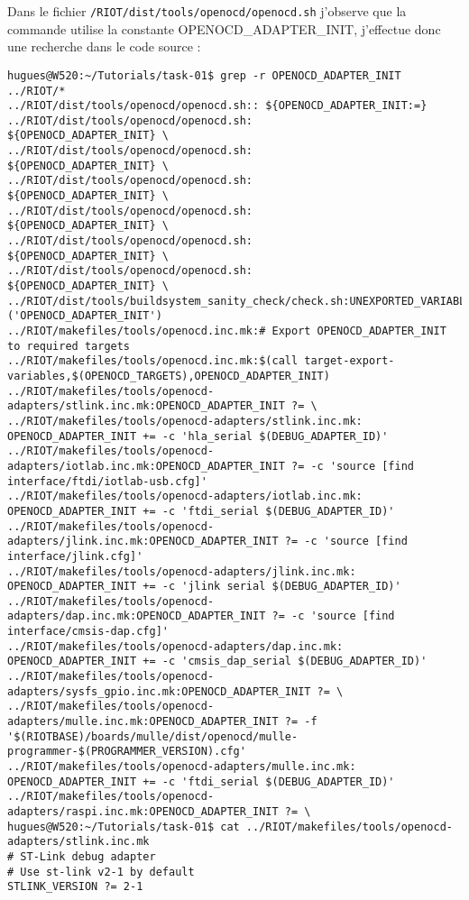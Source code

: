 Dans le fichier \texttt{/RIOT/dist/tools/openocd/openocd.sh} j'observe que la
commande utilise la constante OPENOCD\_ADAPTER\_INIT, j'effectue donc une recherche
dans le code source :
{\scriptsize
\begin{verbatim}
hugues@W520:~/Tutorials/task-01$ grep -r OPENOCD_ADAPTER_INIT ../RIOT/*
../RIOT/dist/tools/openocd/openocd.sh:: ${OPENOCD_ADAPTER_INIT:=}
../RIOT/dist/tools/openocd/openocd.sh:            ${OPENOCD_ADAPTER_INIT} \
../RIOT/dist/tools/openocd/openocd.sh:            ${OPENOCD_ADAPTER_INIT} \
../RIOT/dist/tools/openocd/openocd.sh:            ${OPENOCD_ADAPTER_INIT} \
../RIOT/dist/tools/openocd/openocd.sh:            ${OPENOCD_ADAPTER_INIT} \
../RIOT/dist/tools/openocd/openocd.sh:            ${OPENOCD_ADAPTER_INIT} \
../RIOT/dist/tools/openocd/openocd.sh:            ${OPENOCD_ADAPTER_INIT} \
../RIOT/dist/tools/buildsystem_sanity_check/check.sh:UNEXPORTED_VARIABLES+=('OPENOCD_ADAPTER_INIT')
../RIOT/makefiles/tools/openocd.inc.mk:# Export OPENOCD_ADAPTER_INIT to required targets
../RIOT/makefiles/tools/openocd.inc.mk:$(call target-export-variables,$(OPENOCD_TARGETS),OPENOCD_ADAPTER_INIT)
../RIOT/makefiles/tools/openocd-adapters/stlink.inc.mk:OPENOCD_ADAPTER_INIT ?= \
../RIOT/makefiles/tools/openocd-adapters/stlink.inc.mk:  OPENOCD_ADAPTER_INIT += -c 'hla_serial $(DEBUG_ADAPTER_ID)'
../RIOT/makefiles/tools/openocd-adapters/iotlab.inc.mk:OPENOCD_ADAPTER_INIT ?= -c 'source [find interface/ftdi/iotlab-usb.cfg]'
../RIOT/makefiles/tools/openocd-adapters/iotlab.inc.mk:  OPENOCD_ADAPTER_INIT += -c 'ftdi_serial $(DEBUG_ADAPTER_ID)'
../RIOT/makefiles/tools/openocd-adapters/jlink.inc.mk:OPENOCD_ADAPTER_INIT ?= -c 'source [find interface/jlink.cfg]'
../RIOT/makefiles/tools/openocd-adapters/jlink.inc.mk:  OPENOCD_ADAPTER_INIT += -c 'jlink serial $(DEBUG_ADAPTER_ID)'
../RIOT/makefiles/tools/openocd-adapters/dap.inc.mk:OPENOCD_ADAPTER_INIT ?= -c 'source [find interface/cmsis-dap.cfg]'
../RIOT/makefiles/tools/openocd-adapters/dap.inc.mk:  OPENOCD_ADAPTER_INIT += -c 'cmsis_dap_serial $(DEBUG_ADAPTER_ID)'
../RIOT/makefiles/tools/openocd-adapters/sysfs_gpio.inc.mk:OPENOCD_ADAPTER_INIT ?= \
../RIOT/makefiles/tools/openocd-adapters/mulle.inc.mk:OPENOCD_ADAPTER_INIT ?= -f '$(RIOTBASE)/boards/mulle/dist/openocd/mulle-programmer-$(PROGRAMMER_VERSION).cfg'
../RIOT/makefiles/tools/openocd-adapters/mulle.inc.mk:  OPENOCD_ADAPTER_INIT += -c 'ftdi_serial $(DEBUG_ADAPTER_ID)'
../RIOT/makefiles/tools/openocd-adapters/raspi.inc.mk:OPENOCD_ADAPTER_INIT ?= \
hugues@W520:~/Tutorials/task-01$ cat ../RIOT/makefiles/tools/openocd-adapters/stlink.inc.mk
# ST-Link debug adapter
# Use st-link v2-1 by default
STLINK_VERSION ?= 2-1


\end{verbatim}}
